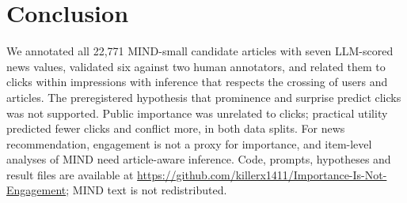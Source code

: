 \section{Conclusion}
We annotated all 22,771 MIND-small candidate articles with seven LLM-scored news values, validated six against two human annotators, and related them to clicks within impressions with inference that respects the crossing of users and articles. The preregistered hypothesis that prominence and surprise predict clicks was not supported. Public importance was unrelated to clicks; practical utility predicted fewer clicks and conflict more, in both data splits. For news recommendation, engagement is not a proxy for importance, and item-level analyses of MIND need article-aware inference. Code, prompts, hypotheses and result files are available at \url{https://github.com/killerx1411/Importance-Is-Not-Engagement}; MIND text is not redistributed.
